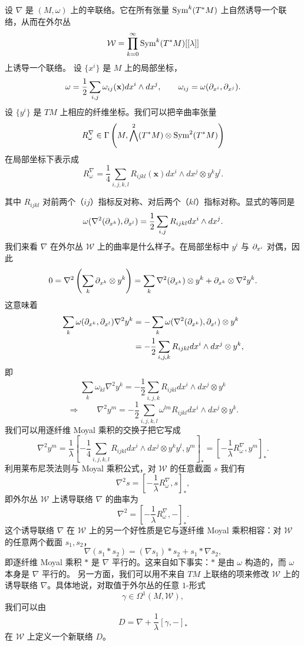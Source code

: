 设 $\nabla$ 是 $(M,\omega)$ 上的辛联络。它在所有张量 $\operatorname{Sym}^k(T^*M)$ 上自然诱导一个联络，从而在外尔丛
\[
\mathcal{W}=\prod_{k=0}^\infty\operatorname{Sym}^k(T^*M)[[\lambda]]
\]
上诱导一个联络。
设 $\{x^i\}$ 是 $M$ 上的局部坐标，
\[
\omega=\frac{1}{2}\sum_{i,j}\omega_{ij}(\mathbf x)dx^i\wedge dx^j,
\qquad \omega_{ij}=\omega(\partial_{x^i},\partial_{x^j}).
\]
设 $\{y^i\}$ 是 $TM$ 上相应的纤维坐标。我们可以把辛曲率张量
\[
R^\nabla_\omega\in\Gamma\left(M,\bigwedge^2(T^*M)\otimes\operatorname{Sym}^2(T^*M)\right)
\]
在局部坐标下表示成
\[
R^\nabla_\omega=\frac{1}{4}\sum_{i,j,k,l}R_{ijkl}(\mathbf x)
dx^i\wedge dx^j\otimes y^ky^l.
\]

其中 $R_{ijkl}$ 对前两个（$ij$）指标反对称、对后两个（$kl$）指标对称。显式的等同是
\[
\omega(\nabla^2(\partial_{x^k}),\partial_{x^l})
=\frac{1}{2}\sum_{i,j}R_{ijkl}dx^i\wedge dx^j.
\]
我们来看 $\nabla$ 在外尔丛 $\mathcal{W}$ 上的曲率是什么样子。在局部坐标中
$y^i$ 与 $\partial_{x^i}$ 对偶，因此
\[
0=\nabla^2\left(\sum_k\partial_{x^k}\otimes y^k\right)
=\sum_k\nabla^2(\partial_{x^k})\otimes y^k+\partial_{x^k}\otimes\nabla^2y^k.
\]
这意味着
\begin{align*}
\sum_k\omega(\partial_{x^k},\partial_{x^l})\nabla^2y^k
&=-\sum_k\omega(\nabla^2(\partial_{x^k}),\partial_{x^l})\otimes y^k\\
&=-\frac{1}{2}\sum_{i,j,k}R_{ijkl}dx^i\wedge dx^j\otimes y^k,
\end{align*}
即
\[
\sum_k\omega_{kl}\nabla^2y^k
=-\frac{1}{2}\sum_{i,j,k}R_{ijkl}dx^i\wedge dx^j\otimes y^k
\]
\[
\Longrightarrow\qquad
\nabla^2y^m=-\frac{1}{2}\sum_{i,j,k,l}\omega^{lm}R_{ijkl}
dx^i\wedge dx^j\otimes y^k.
\]
我们可以用逐纤维 Moyal 乘积的交换子把它写成
\[
\nabla^2y^m=\frac{1}{\lambda}
\left[-\frac{1}{4}\sum_{i,j,k,l}R_{ijkl}dx^i\wedge dx^j\otimes y^ky^l,
y^m\right]_*
=\left[-\frac{1}{\lambda}R^\nabla_\omega,y^m\right]_*.
\]
利用莱布尼茨法则与 Moyal 乘积公式，对 $\mathcal{W}$ 的任意截面 $s$ 我们有
\[
\nabla^2s=\left[-\frac{1}{\lambda}R^\nabla_\omega,s\right]_*,
\]
即外尔丛 $\mathcal{W}$ 上诱导联络 $\nabla$ 的曲率为
\[
\nabla^2=\left[-\frac{1}{\lambda}R^\nabla_\omega,-\right]_*.
\]
这个诱导联络 $\nabla$ 在 $\mathcal{W}$ 上的另一个好性质是它与逐纤维 Moyal 乘积相容：对 $\mathcal{W}$ 的任意两个截面 $s_1,s_2$，
\[
\nabla(s_1*s_2)=(\nabla s_1)*s_2+s_1*\nabla s_2,
\]
即逐纤维 Moyal 乘积 $*$ 是 $\nabla$ 平行的。这来自如下事实：$*$ 是由 $\omega$ 构造的，而 $\omega$ 本身是 $\nabla$ 平行的。
另一方面，我们可以用不来自 $TM$ 上联络的项来修改 $\mathcal{W}$ 上的诱导联络 $\nabla$。具体地说，对取值于外尔丛的任意 $1$-形式
\[
\gamma\in\Omega^1(M,\mathcal{W}),
\]
我们可以由
\[
D=\nabla+\frac{1}{\lambda}[\gamma,-]_*
\]
在 $\mathcal{W}$ 上定义一个新联络 $D$。

